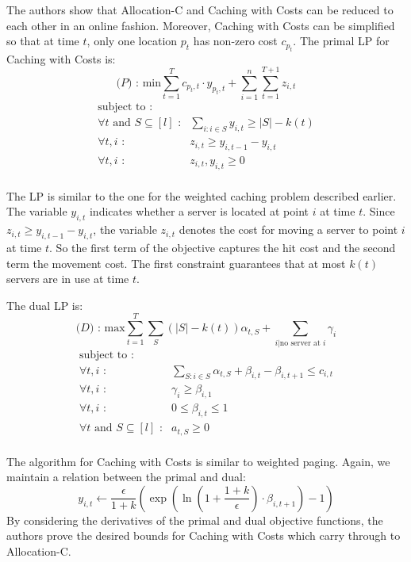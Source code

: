 The authors show that Allocation-C and Caching with Costs can be reduced to each other in an online fashion.
Moreover, Caching with Costs can be simplified so that at time $t$, only one location $p_t$ has non-zero cost $c_{p_t}$.
The primal LP for Caching with Costs is:
\[
\textrm{($P$) : min}  \sum_{t=1}^T c_{p_t, t} \cdot y_{p_t,t} + \sum_{i=1}^n\sum_{t=1}^{T+1} z_{i,t}
\]
\[
	\begin{array}{lr}
	\textrm{subject to :} & \\
		\forall t \textrm{ and } S \subseteq [l] \textrm{ :} & \sum_{i : i \in S} y_{i,t} \geq |S| - k(t) \\
		\forall t,i \textrm{ :} & z_{i,t} \geq y_{i,t-1} - y_{i,t} \\
		\forall t,i \textrm{ :} & z_{i,t}, y_{i,t} \geq 0 \\
	\end{array}
\]


The LP is similar to the one for the weighted caching problem described earlier.
The variable $y_{i,t}$ indicates whether a server is located at point $i$ at time $t$.
Since $z_{i,t} \geq y_{i,t-1} - y_{i,t}$, the variable $z_{i,t}$ denotes the cost for moving a server to point $i$ at time $t$.
So the first term of the objective captures the hit cost and the second term the movement cost.
The first constraint guarantees that at most $k(t)$ servers are in use at time $t$.

The dual LP is:
\[
\textrm{($D$) : max}  \sum_{t=1}^T\sum_S (|S| - k(t)) \alpha_{t,S} + \sum_{i | \textrm{no server at }i} \gamma_i
\]
\[
	\begin{array}{lr}
	\textrm{subject to :} & \\
		\forall t,i \textrm{ :} & \sum_{S: i\in S} \alpha_{t,S} + \beta_{i,t} - \beta_{i,t+1} \leq c_{i,t}\\
		\forall t,i \textrm{ :} & \gamma_i \geq \beta_{i, 1} \\
		\forall t,i \textrm{ :} & 0 \leq \beta_{i, t} \leq 1\\
		\forall t \textrm { and } S \subseteq [l] \textrm{ :} & a_{t,S} \geq 0\\
	\end{array}
\]


The algorithm for Caching with Costs is similar to weighted paging.
Again, we maintain a relation between the primal and dual:
\[
y_{i,t} \leftarrow \frac{\epsilon}{1 + k} \left( \exp\left( \ln\left( 1 + \frac{1+k}{\epsilon} \right) \cdot \beta_{i, t+1} \right) - 1 \right)
\]
By considering the derivatives of the primal and dual objective functions, the authors prove the desired bounds for Caching with Costs which carry through to Allocation-C.
